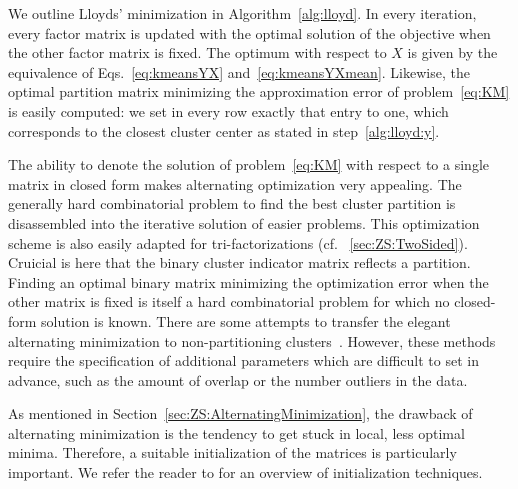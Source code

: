 We outline Lloyds' minimization in Algorithm~\ref{alg:lloyd}. In every iteration, every factor matrix is updated with the optimal solution of the objective when the other factor matrix is fixed. The optimum with respect to $X$ is given by the equivalence of Eqs.~\eqref{eq:kmeansYX} and~\eqref{eq:kmeansYXmean}. Likewise, the optimal partition matrix minimizing the approximation error of problem~\eqref{eq:KM} is easily computed: we set in every row exactly that entry to one, which corresponds to the closest cluster center as stated in step~\ref{alg:lloyd:y}.

The ability to denote the solution of problem~\eqref{eq:KM} with respect to a single matrix in closed form makes alternating optimization very appealing. The generally hard combinatorial problem to find the best cluster partition is disassembled into the iterative solution of easier problems. This optimization scheme is also easily adapted for tri-factorizations (cf. \@Section~\ref{sec:ZS:TwoSided}). Cruicial is here that the binary cluster indicator matrix reflects a partition. Finding an optimal binary matrix minimizing the optimization error when the other matrix is fixed is itself a hard combinatorial problem for which no closed-form solution is known.
There are some attempts to transfer the elegant alternating minimization to non-partitioning clusters~\citep{chawla2013kmeans,whang2018non}. However, these methods require the specification of additional parameters which are difficult to set in advance, such as the amount of overlap or the number outliers in the data.

As mentioned in Section~\ref{sec:ZS:AlternatingMinimization}, the drawback of alternating minimization is the tendency to get stuck in local, less optimal minima. Therefore, a suitable initialization of the matrices is particularly important. We refer the reader to \cite{celebi2013comparative} for an overview of initialization techniques. 

